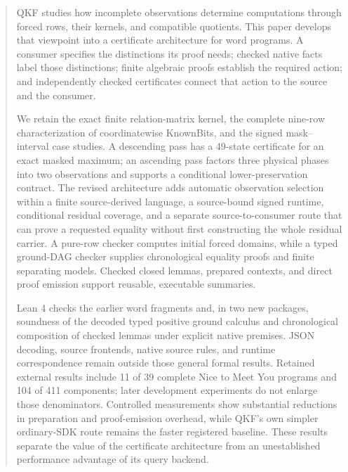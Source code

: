 \begin{abstract}
QKF studies how incomplete observations determine computations through forced rows, their kernels, and compatible quotients. This paper develops that viewpoint into a certificate architecture for word programs. A consumer specifies the distinctions its proof needs; checked native facts label those distinctions; finite algebraic proofs establish the required action; and independently checked certificates connect that action to the source and the consumer.

We retain the exact finite relation-matrix kernel, the complete nine-row characterization of coordinatewise KnownBits, and the signed mask--interval case studies. A descending pass has a 49-state certificate for an exact masked maximum; an ascending pass factors three physical phases into two observations and supports a conditional lower-preservation contract. The revised architecture adds automatic observation selection within a finite source-derived language, a source-bound signed runtime, conditional residual coverage, and a separate source-to-consumer route that can prove a requested equality without first constructing the whole residual carrier. A pure-row checker computes initial forced domains, while a typed ground-DAG checker supplies chronological equality proofs and finite separating models. Checked closed lemmas, prepared contexts, and direct proof emission support reusable, executable summaries.

Lean 4 checks the earlier word fragments and, in two new packages, soundness of the decoded typed positive ground calculus and chronological composition of checked lemmas under explicit native premises. JSON decoding, source frontends, native source rules, and runtime correspondence remain outside those general formal results. Retained external results include 11 of 39 complete Nice to Meet You programs and 104 of 411 components; later development experiments do not enlarge those denominators. Controlled measurements show substantial reductions in preparation and proof-emission overhead, while QKF's own simpler ordinary-SDK route remains the faster registered baseline. These results separate the value of the certificate architecture from an unestablished performance advantage of its query backend.
\end{abstract}
